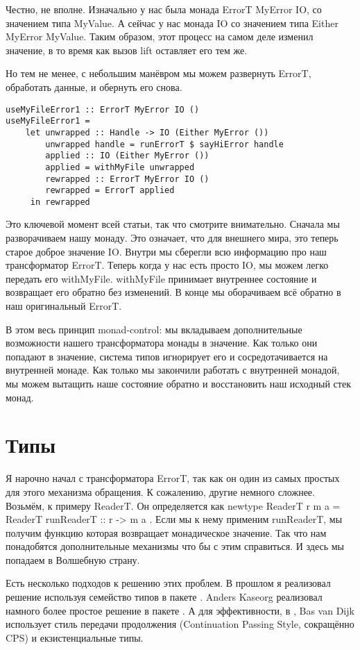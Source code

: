 Честно, не вполне. Изначально у нас была монада ErrorT MyError IO, со значением
типа MyValue. А сейчас у нас монада IO со значением типа Either MyError
MyValue. Таким образом, этот процесс на самом деле изменил значение, в то время
как вызов lift оставляет его тем же.

Но тем не менее, с небольшим манёвром мы можем развернуть ErrorT, обработать
данные, и обернуть его снова.

\begin{lstlisting}
useMyFileError1 :: ErrorT MyError IO ()
useMyFileError1 =
    let unwrapped :: Handle -> IO (Either MyError ())
        unwrapped handle = runErrorT $ sayHiError handle
        applied :: IO (Either MyError ())
        applied = withMyFile unwrapped
        rewrapped :: ErrorT MyError IO ()
        rewrapped = ErrorT applied
     in rewrapped
\end{lstlisting}

Это ключевой момент всей статьи, так что смотрите внимательно. Сначала мы
разворачиваем нашу монаду. Это означает, что для внешнего мира, это теперь
старое доброе значение IO. Внутри мы сберегли всю информацию про наш
трансформатор ErrorT. Теперь когда у нас есть просто IO, мы можем легко
передать его withMyFile. withMyFile принимает внутреннее состояние и возвращает
его обратно без изменений. В конце мы оборачиваем всё обратно в наш
оригинальный ErrorT.

В этом весь принцип monad-control: мы вкладываем дополнительные возможности
нашего трансформатора монады в значение. Как только они попадают в значение,
система типов игнорирует его и сосредотачивается на внутренней монаде. Как
только мы закончили работать с внутренней монадой, мы можем вытащить наше
состояние обратно и восстановить наш исходный стек монад.

\section{Типы}
Я нарочно начал с трансформатора ErrorT, так как он один из самых простых для
этого механизма обращения. К сожалению, другие немного сложнее. Возьмём, к
примеру ReaderT. Он определяется как newtype ReaderT r m a = ReaderT {
runReaderT :: r -> m a }. Если мы к нему применим runReaderT, мы получим
функцию которая возвращает монадическое значение. Так что нам понадобятся
дополнительные механизмы что бы с этим справиться. И здесь мы попадаем в
Волшебную страну.

Есть несколько подходов к решению этих проблем. В прошлом я реализовал решение
используя семейство типов в пакете
. Anders
Kaseorg реализовал намного более простое решение в пакете
. А для
эффективности, в
,
Bas van Dijk использует стиль передачи продолжения (Continuation Passing Style,
сокращённо CPS) и екзистенциальные типы.

